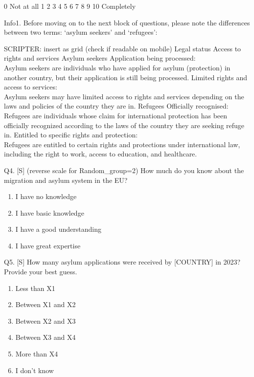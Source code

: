 \documentclass[
  12pt,
  a4paper,
]{article}
\providecommand{\tightlist}{%
  \setlength{\itemsep}{0pt}\setlength{\parskip}{0pt}}
\begin{document}
0
Not at all 1 2 3 4 5 6 7 8 9 10
Completely

Info1. Before moving on to the next block of questions, please note the differences between two terms: `asylum seekers' and `refugees':

SCRIPTER: insert as grid (check if readable on mobile)
Legal status Access to rights and services
Asylum seekers Application being processed:\\
Asylum seekers are individuals who have applied for asylum (protection) in another country, but their application is still being processed. Limited rights and access to services:\\
Asylum seekers may have limited access to rights and services depending on the laws and policies of the country they are in.
Refugees Officially recognised:\\
Refugees are individuals whose claim for international protection has been officially recognized according to the laws of the country they are seeking refuge in. Entitled to specific rights and protection:\\
Refugees are entitled to certain rights and protections under international law, including the right to work, access to education, and healthcare.

Q4. {[}S{]} (reverse scale for Random\_group=2) How much do you know about the migration and asylum system in the EU?

\begin{enumerate}
\def\labelenumi{\arabic{enumi}.}
\tightlist
\item
  I have no knowledge\\
\item
  I have basic knowledge\\
\item
  I have a good understanding\\
\item
  I have great expertise
\end{enumerate}

Q5. {[}S{]} How many asylum applications were received by {[}COUNTRY{]} in 2023?\\
Provide your best guess.

\begin{enumerate}
\def\labelenumi{\arabic{enumi}.}
\item
  Less than X1
\item
  Between X1 and X2
\item
  Between X2 and X3
\item
  Between X3 and X4
\item
  More than X4
\item
  I don't know
\end{enumerate}
\end{document}
